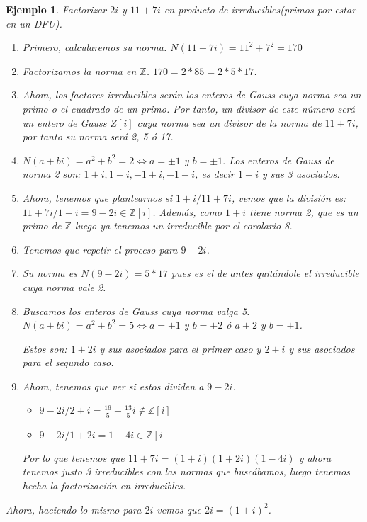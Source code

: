 \documentclass[11pt, a4paper, titlepage]{article}
\newif\IfInSansMode
\providecommand{\ent}{\mathbb{Z}}
\theoremstyle{theorem-style}
\theoremstyle{definition-style}
\theoremstyle{remark-style}
\theoremstyle{example-style}
\newtheorem{ejemplo}{Ejemplo}[section]
\begin{document}
\begin{ejemplo}
	Factorizar $2i$ y $11+7i$ en producto de irreducibles(primos por estar en un DFU).

	\begin{enumerate}
	\item Primero, calcularemos su norma. $N(11+7i) = 11^2 + 7^2 = 170$
	\item Factorizamos la norma en $\ent$. $170 = 2*85 = 2*5 *17$.
	\item Ahora, los factores irreducibles serán los enteros de Gauss cuya norma sea un primo o el cuadrado de un primo. Por tanto, un divisor de este número será un entero de Gauss $Z[i]$ cuya norma sea un divisor de la norma de $11+7i$, por tanto su norma será 2, 5 ó 17.
	\item  $N(a+bi) = a^2 +b^2 = 2 \iff a=\pm 1$ y $b= \pm 1.$ Los enteros de Gauss de norma 2 son: $1+i,1-i,-1+i,-1-i$, es decir $1+i$ y sus 3 asociados.
	\item Ahora, tenemos que plantearnos si $1+i / 11+7i$, vemos que la división es: $11+7i/1+i = 9-2i\in \ent[i]$. Además, como $1+i$ tiene norma 2, que es un primo de $\ent$ luego ya tenemos un irreducible por el corolario 8.
	\item Tenemos que repetir el proceso para $9-2i$.
	\item Su norma es $N(9-2i) = 5*17$ pues es el de antes quitándole el irreducible cuya norma vale 2.
	\item Buscamos los enteros de Gauss cuya norma valga 5. $N(a+bi) = a^2 +b^2 = 5 \iff a = \pm 1$ y $b =\pm 2$ ó $a \pm 2$ y $b = \pm 1$.

	Estos son: $1+2i$ y sus asociados para el primer caso y $2+i$ y sus asociados para el segundo caso.

	\item Ahora, tenemos que ver si estos dividen a $9-2i$.
	\begin{itemize}
	\item $9-2i/2+i  = \frac{16}{5} + \frac{13}{5}i \notin \ent[i]$
	\item $9-2i /1+2i = 1-4i \in \ent[i]$
\end{itemize}

Por lo que tenemos que $11+7i = (1+i)(1+2i)(1-4i)$ y ahora tenemos justo 3 irreducibles con las normas que buscábamos, luego tenemos hecha la factorización en irreducibles.

\end{enumerate}

Ahora, haciendo lo mismo para $2i$ vemos que $2i = (1+i)^2$.


\end{ejemplo}
\end{document}
